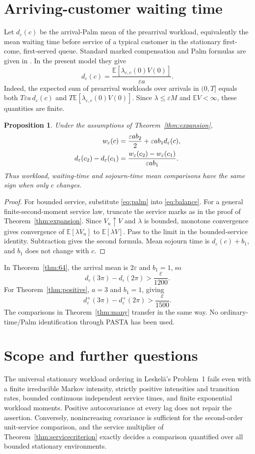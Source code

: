\documentclass[aap,preprint]{imsart}
\numberwithin{equation}{section}
\theoremstyle{plain}
\newtheorem{proposition}[theorem]{Proposition}
\theoremstyle{definition}
\newcommand{\E}{\mathbb E}
\newcommand{\1}{\mathbf 1}
\newcommand{\eps}{\varepsilon}
\begin{document}
\section{Arriving-customer waiting time}\label{sec:palm}
Let $d_\eps(c)$ be the arrival-Palm mean of the prearrival workload, equivalently the mean waiting time before service of a typical customer in the stationary first-come, first-served queue. Standard marked compensation and Palm formulas are given in \cite{Bremaud81,BB03,LP18}. In the present model they give
\begin{equation}\label{eq:palm}
 d_\eps(c)=\frac{\E[\lambda_{\eps,c}(0)V(0)]}{\eps a}.
\end{equation}
Indeed, the expected sum of prearrival workloads over arrivals in $(0,T]$ equals both $T\eps a\,d_\eps(c)$ and $T\E[\lambda_{\eps,c}(0)V(0)]$. Since $\lambda\le\eps M$ and $\E V<\infty$, these quantities are finite.

\begin{proposition}\label{prop:palm}
Under the assumptions of Theorem~\ref{thm:expansion},
\begin{align}\label{eq:palmbalance}
 w_\eps(c)&=\frac{\eps ab_2}{2}+\eps ab_1d_\eps(c),\notag\\
 d_\eps(c_2)-d_\eps(c_1)
 &=\frac{w_\eps(c_2)-w_\eps(c_1)}{\eps ab_1}.
\end{align}
Thus workload, waiting-time and sojourn-time mean comparisons have the same sign when only $c$ changes.
\end{proposition}
\begin{proof}
For bounded service, substitute \eqref{eq:palm} into \eqref{eq:balance}. For a general finite-second-moment service law, truncate the service marks as in the proof of Theorem~\ref{thm:expansion}. Since $V_n\uparrow V$ and $\lambda$ is bounded, monotone convergence gives convergence of $\E[\lambda V_n]$ to $\E[\lambda V]$. Pass to the limit in the bounded-service identity. Subtraction gives the second formula. Mean sojourn time is $d_\eps(c)+b_1$, and $b_1$ does not change with $c$.
\end{proof}
In Theorem~\ref{thm:64}, the arrival mean is $2\eps$ and $b_1=1$, so
\[
 d_\eps(3\pi)-d_\eps(2\pi)>\frac{\eps}{1200}.
\]
For Theorem~\ref{thm:positive}, $a=3$ and $b_1=1$, giving
\[
 d^+_\eps(3\pi)-d^+_\eps(2\pi)>\frac{\eps}{1500}.
\]
The comparisons in Theorem~\ref{thm:many} transfer in the same way. No ordinary-time/Palm identification through PASTA has been used.

\section{Scope and further questions}
The universal stationary workload ordering in Leskel\"a's Problem~1 fails even with a finite irreducible Markov intensity, strictly positive intensities and transition rates, bounded continuous independent service times, and finite exponential workload moments. Positive autocovariance at every lag does not repair the assertion. Conversely, nonincreasing covariance is sufficient for the second-order unit-service comparison, and the service multiplier of Theorem~\ref{thm:servicecriterion} exactly decides a comparison quantified over all bounded stationary environments.
\end{document}

